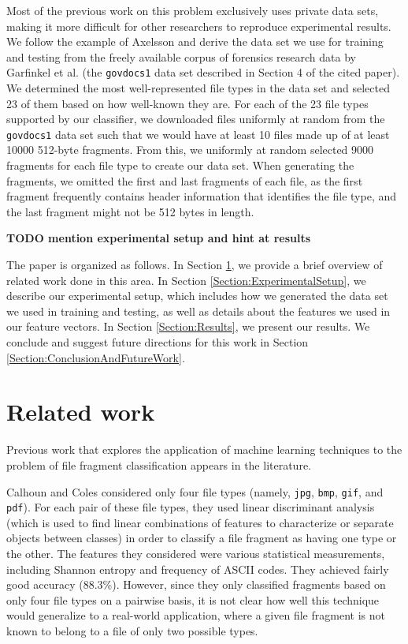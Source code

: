 \documentclass[letter,11pt]{article}
\begin{document}
Most of the previous work on this problem exclusively uses private data sets, making it more difficult for other researchers to reproduce experimental results. We follow the example of Axelsson \cite{Axelsson10} and derive the data set we use for training and testing from the freely available corpus of forensics research data by Garfinkel et al. \cite{Garfinkel09} (the \texttt{govdocs1} data set described in Section 4 of the cited paper). We determined the most well-represented file types in the data set and selected 23 of them based on how well-known they are. For each of the 23 file types supported by our classifier, we downloaded files uniformly at random from the \texttt{govdocs1} data set such that we would have at least 10 files made up of at least 10000 512-byte fragments. From this, we uniformly at random selected 9000 fragments for each file type to create our data set. When generating the fragments, we omitted the first and last fragments of each file, as the first fragment frequently contains header information that identifies the file type, and the last fragment might not be 512 bytes in length.

\textbf{TODO mention experimental setup and hint at results}

The paper is organized as follows. In Section \ref{Section:RelatedWork}, we provide a brief overview of related work done in this area. In Section \ref{Section:ExperimentalSetup}, we describe our experimental setup, which includes how we generated the data set we used in training and testing, as well as details about the features we used in our feature vectors. In Section \ref{Section:Results}, we present our results. We conclude and suggest future directions for this work in Section \ref{Section:ConclusionAndFutureWork}.

\section{Related work}
\label{Section:RelatedWork}
Previous work that explores the application of machine learning techniques to the problem of file fragment classification appears in the literature.

Calhoun and Coles \cite{Calhoun08} considered only four file types (namely, \texttt{jpg}, \texttt{bmp}, \texttt{gif}, and \texttt{pdf}). For each pair of these file types, they used linear discriminant analysis \cite{Fisher36} (which is used to find linear combinations of features to characterize or separate objects between classes) in order to classify a file fragment as having one type or the other. The features they considered were various statistical measurements, including Shannon entropy \cite{Shannon48} and frequency of ASCII codes. They achieved fairly good accuracy (88.3\%). However, since they only classified fragments based on only four file types on a pairwise basis, it is not clear how well this technique would generalize to a real-world application, where a given file fragment is not known to belong to a file of only two possible types.
\end{document}
